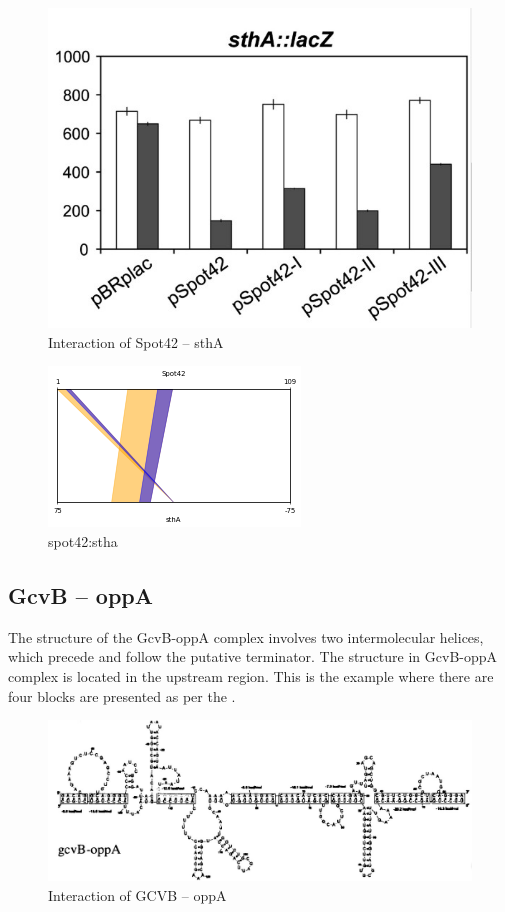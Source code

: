 \documentclass[twoside,a4paper]{report}
\begin{document}
		\begin{figure}[h!tb]
		\includegraphics[width=0.6\linewidth]{spot42}
		\centering
		\caption{ Interaction of Spot42 – sthA } 
		\label{fig:spot42}
	\end{figure}

	\begin{figure}[h!tb]
		\centering
		\includegraphics[width=.5\linewidth]{spot}
		\caption{spot42:stha}
		\label{fig:spot4}
	\end{figure}

\clearpage

	\subsection{GcvB – oppA }
	The structure of the GcvB-oppA complex involves two intermolecular helices, which precede and follow the putative terminator. The structure in GcvB-oppA complex is located in the upstream region. This is the example where there are four blocks are presented as per the {\citep{pervouchine2004iris}} . \\ 
	
		\begin{figure}[h!tb]
		\includegraphics[width=1.0\linewidth]{oppa}
		\centering
		\caption{ Interaction of GCVB – oppA } 
		\label{fig:oppa}
	\end{figure}
\end{document}
